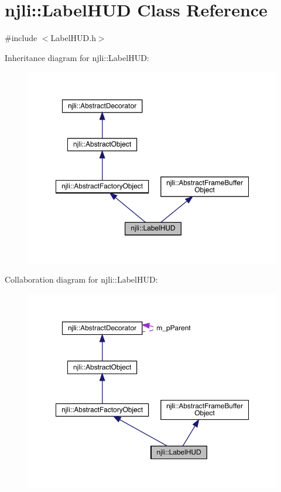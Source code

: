 \hypertarget{classnjli_1_1_label_h_u_d}{}\section{njli\+:\+:Label\+H\+UD Class Reference}
\label{classnjli_1_1_label_h_u_d}


{\ttfamily \#include $<$Label\+H\+U\+D.\+h$>$}



Inheritance diagram for njli\+:\+:Label\+H\+UD\+:\nopagebreak
\begin{figure}[H]
\begin{center}
\leavevmode
\includegraphics[width=350pt]{classnjli_1_1_label_h_u_d__inherit__graph}
\end{center}
\end{figure}


Collaboration diagram for njli\+:\+:Label\+H\+UD\+:\nopagebreak
\begin{figure}[H]
\begin{center}
\leavevmode
\includegraphics[width=350pt]{classnjli_1_1_label_h_u_d__coll__graph}
\end{center}
\end{figure}
